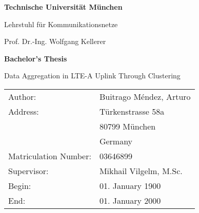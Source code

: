\documentclass[12pt,a4paper]{report}
\begin{document}
\thispagestyle{empty}
\newpage

\vspace{5cm}
\begin{center}
    \epsfxsize=4cm
\end{center}

\parbox{15cm}{\begin{center} {\sf\bf 
                               \Large  Technische Universität München
                                \smallskip

                               \Large Lehrstuhl für Kommunikationsnetze
                               \smallskip
                              }

                              {\sf \large Prof. Dr.-Ing. Wolfgang Kellerer} 
              \end{center}}  %

\vspace{4cm}

\begin{center}
        {\bf\Huge Bachelor's Thesis} %
\end{center}

\begin{center}
        \settowidth{\baselineskip}{0.4cm}
        {\LARGE 
        Data Aggregation in LTE-A Uplink Through Clustering
        }
\end{center}

\vfill         
{\settowidth{\baselineskip}{0.2cm}
\large\begin{tabular}[l]{ll}
Author: & Buitrago M\'{e}ndez, Arturo\\
Address: & T\"{u}rkenstrasse 58a\\
         & 80799 M\"{u}nchen\\
         & Germany\\
Matriculation Number: & 03646899\\
Supervisor: & Mikhail Vilgelm, M.Sc.\\
Begin: & 01. January 1900\\
End: & 01. January 2000
\end{tabular}}




\tableofcontents  

\end{document}
